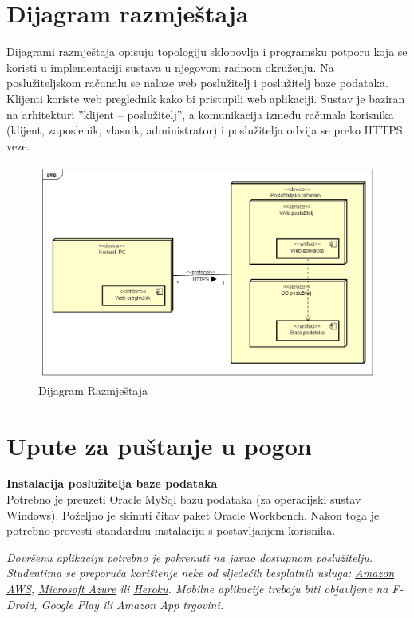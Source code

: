			\eject 
		
		
		\section{Dijagram razmještaja}
			
			Dijagrami razmještaja opisuju topologiju sklopovlja i programsku potporu koja se koristi u implementaciji sustava u njegovom radnom okruženju. Na poslužiteljskom računalu se nalaze web poslužitelj i poslužitelj baze podataka. Klijenti koriste web preglednik kako bi pristupili web aplikaciji. Sustav je baziran na arhitekturi ”klijent – poslužitelj”, a komunikacija između računala korisnika (klijent, zaposlenik, vlasnik, administrator) i poslužitelja odvija se preko HTTPS veze.
			
			
			\begin{figure}[H]
				\includegraphics[width=\textwidth]{slike/DijagramRazmjestaja.png} %
				\caption{Dijagram Razmještaja}
				\label{fig:DijagramRazmještaja} %
			\end{figure}
			
			\eject 
		
		\section{Upute za puštanje u pogon}
		
			\textbf{Instalacija poslužitelja baze podataka}\\
		
			 Potrebno je preuzeti Oracle MySql bazu podataka (za operacijski sustav Windows).
			 Poželjno je skinuti čitav paket Oracle Workbench. Nakon toga je potrebno provesti standardnu instalaciju s postavljanjem korisnika.
			
			
			 \textit{Dovršenu aplikaciju potrebno je pokrenuti na javno dostupnom poslužitelju. Studentima se preporuča korištenje neke od sljedećih besplatnih usluga: \href{https://aws.amazon.com/}{Amazon AWS}, \href{https://azure.microsoft.com/en-us/}{Microsoft Azure} ili \href{https://www.heroku.com/}{Heroku}. Mobilne aplikacije trebaju biti objavljene na F-Droid, Google Play ili Amazon App trgovini.}
			
			
			\eject 